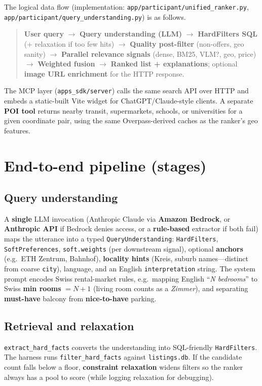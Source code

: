 \documentclass[11pt]{article}
\begin{document}
The logical data flow (implementation: \texttt{app/participant/unified\_ranker.py}, \texttt{app/participant/query\_understanding.py}) is as follows.

\begin{quote}
\textbf{User query} $\rightarrow$ \textbf{Query understanding (LLM)} $\rightarrow$ \textbf{HardFilters SQL} (+ relaxation if too few hits) $\rightarrow$ \textbf{Quality post-filter} (non-offers, geo sanity) $\rightarrow$ \textbf{Parallel relevance signals} (dense, BM25, VLM?, geo, price) $\rightarrow$ \textbf{Weighted fusion} $\rightarrow$ \textbf{Ranked list + explanations}; optional \textbf{image URL enrichment} for the HTTP response.
\end{quote}

\noindent
The MCP layer (\texttt{apps\_sdk/server}) calls the same search API over HTTP and embeds a static-built Vite widget for ChatGPT/Claude-style clients. A separate \textbf{POI tool} returns nearby transit, supermarkets, schools, or universities for a given coordinate pair, using the same Overpass-derived caches as the ranker's geo features.

\section{End-to-end pipeline (stages)}

\subsection{Query understanding}
A \textbf{single} LLM invocation (Anthropic Claude via \textbf{Amazon Bedrock}, or \textbf{Anthropic API} if Bedrock denies access, or a \textbf{rule-based} extractor if both fail) maps the utterance into a typed \texttt{QueryUnderstanding}: \texttt{HardFilters}, \texttt{SoftPreferences}, \texttt{soft.weights} (per downstream signal), optional \textbf{anchors} (e.g.\ ETH Zentrum, Bahnhof), \textbf{locality hints} (Kreis, suburb names---distinct from coarse \texttt{city}), language, and an English \texttt{interpretation} string. The system prompt encodes Swiss rental-market rules, e.g.\ mapping English ``\emph{N bedrooms}'' to Swiss \textbf{min rooms} $= N{+}1$ (living room counts as a \emph{Zimmer}), and separating \textbf{must-have} balcony from \textbf{nice-to-have} parking.

\subsection{Retrieval and relaxation}
\texttt{extract\_hard\_facts} converts the understanding into SQL-friendly \texttt{HardFilters}. The harness runs \texttt{filter\_hard\_facts} against \texttt{listings.db}. If the candidate count falls below a floor, \textbf{constraint relaxation} widens filters so the ranker always has a pool to score (while logging relaxation for debugging).
\end{document}
